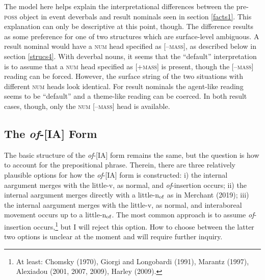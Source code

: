 \documentclass[12pt]{article}
\newcommand*{\textsub}[1]{\ensuremath{_\textrm{{\scriptsize #1}}}}
\begin{document}
The model here helps explain the interpretational differences between the pre-\textsc{poss} object in event deverbals and result nominals seen in section \ref{facts1}. This explanation can only be descriptive at this point, though. The difference results as some preference for one of two structures which are surface-level ambiguous. A result nominal would have a \textsc{num} head specified as [--\textsc{mass}], as described below in section \ref{strucs4}. With deverbal nouns, it seems that the ``default'' interpretation is to assume that a \textsc{num} head specified as [+\textsc{mass}] is present, though the [--\textsc{mass}] reading can be forced. However, the surface string of the two situations with different \textsc{num} heads look identical. For result nominals the agent-like reading seems to be ``default'' and a theme-like reading can be coerced. In both result cases, though, only the \textsc{num} [--\textsc{mass}] head is available.


\subsection{The \textit{of}-[IA] Form}\label{strucs3}

The basic structure of the \textit{of}-[IA] form remains the same, but the question is how to account for the prepositional phrase. Therein, there are three relatively plausible options for how the \textit{of}-[IA] form is constructed: i) the internal aargument merges with the little-v, as normal, and \textit{of}-insertion occurs; ii) the internal aargument merges directly with a little-n\textsub{of} as in Merchant (2019); iii) the internal aargument merges with the little-v, as normal, and interaboreal movement occurs up to a little-n\textsub{of}. The most common approach is to assume \textit{of}-insertion occurs,\footnote{ At least: Chomsky (1970), Giorgi and Longobardi (1991), Marantz (1997), Alexiadou (2001, 2007, 2009), Harley (2009).} but I will reject this option. How to choose between the latter two options is unclear at the moment and will require further inquiry.
\end{document}
